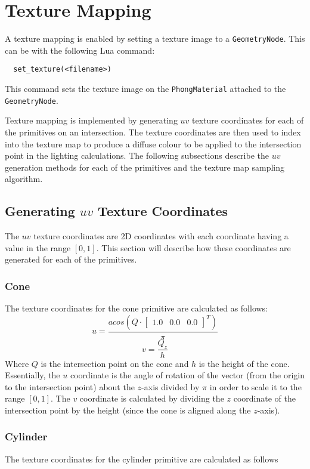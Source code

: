 \section{Texture Mapping}

A texture mapping is enabled by setting a texture image to a
\verb|GeometryNode|. This can be with the following Lua command:
\begin{lstlisting}
  set_texture(<filename>)
\end{lstlisting}
This command sets the texture image on the \verb|PhongMaterial| attached to the
\verb|GeometryNode|. 

Texture mapping is implemented by generating $uv$ texture coordinates for each
of the primitives on an intersection. The texture coordinates are then used to
index into the texture map to produce a diffuse colour to be applied to the
intersection point in the lighting calculations. The following subsections
describe the $uv$ generation methods for each of the primitives and the texture
map sampling algorithm.

\subsection{Generating $uv$ Texture Coordinates}

The $uv$ texture coordinates are 2D coordinates with each coordinate having a
value in the range $[0, 1]$. This section will describe how these coordinates
are generated for each of the primitives.

\subsubsection*{Cone}
The texture coordinates for the cone primitive are calculated as follows:
\begin{equation}
  u = \frac{acos(Q \cdot \begin{bmatrix} 1.0 & 0.0 & 0.0 \end{bmatrix}^{T})}
  {\pi}
\end{equation}
\begin{equation}
  v = \frac{Q_{z}}{h}
\end{equation}
Where $Q$ is the intersection point on the cone and $h$ is the height of the
cone. Essentially, the $u$ coordinate is the angle of rotation of the vector 
(from the origin to the intersection point) about the $z$-axis divided by $\pi$ 
in order to scale it to the range $[0, 1]$. The $v$ coordinate is calculated by
dividing the $z$ coordinate of the intersection point by the height (since the
cone is aligned along the $z$-axis).

\subsubsection*{Cylinder}
The texture coordinates for the cylinder primitive are calculated as follows

